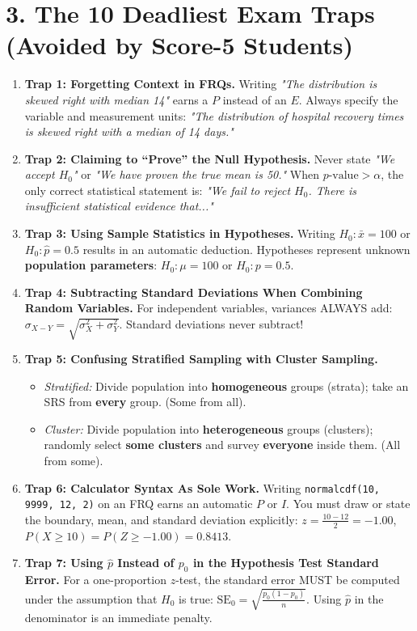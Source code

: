 \section*{3. The 10 Deadliest Exam Traps (Avoided by Score-5 Students)}
\begin{enumerate}[leftmargin=1.5em]
  \item \textbf{Trap 1: Forgetting Context in FRQs.} Writing \textit{"The distribution is skewed right with median 14"} earns a $P$ instead of an $E$. Always specify the variable and measurement units: \textit{"The distribution of hospital recovery times is skewed right with a median of 14 days."}
  \item \textbf{Trap 2: Claiming to ``Prove'' the Null Hypothesis.} Never state \textit{"We accept $H_0$"} or \textit{"We have proven the true mean is 50."} When $p\text{-value} > \alpha$, the only correct statistical statement is: \textit{"We fail to reject $H_0$. There is insufficient statistical evidence that..."}
  \item \textbf{Trap 3: Using Sample Statistics in Hypotheses.} Writing $H_0: \bar{x} = 100$ or $H_0: \hat{p} = 0.5$ results in an automatic deduction. Hypotheses represent unknown \textbf{population parameters}: $H_0: \mu = 100$ or $H_0: p = 0.5$.
  \item \textbf{Trap 4: Subtracting Standard Deviations When Combining Random Variables.} For independent variables, variances ALWAYS add: $\sigma_{X - Y} = \sqrt{\sigma_X^2 + \sigma_Y^2}$. Standard deviations never subtract!
  \item \textbf{Trap 5: Confusing Stratified Sampling with Cluster Sampling.}
  \begin{itemize}
    \item \textit{Stratified:} Divide population into \textbf{homogeneous} groups (strata); take an SRS from \textbf{every} group. (Some from all).
    \item \textit{Cluster:} Divide population into \textbf{heterogeneous} groups (clusters); randomly select \textbf{some clusters} and survey \textbf{everyone} inside them. (All from some).
  \end{itemize}
  \item \textbf{Trap 6: Calculator Syntax As Sole Work.} Writing \texttt{normalcdf(10, 9999, 12, 2)} on an FRQ earns an automatic $P$ or $I$. You must draw or state the boundary, mean, and standard deviation explicitly: $z = \frac{10 - 12}{2} = -1.00$, $P(X \ge 10) = P(Z \ge -1.00) = 0.8413$.
  \item \textbf{Trap 7: Using $\hat{p}$ Instead of $p_0$ in the Hypothesis Test Standard Error.} For a one-proportion $z$-test, the standard error MUST be computed under the assumption that $H_0$ is true: $\text{SE}_0 = \sqrt{\frac{p_0(1 - p_0)}{n}}$. Using $\hat{p}$ in the denominator is an immediate penalty.

\end{enumerate}
